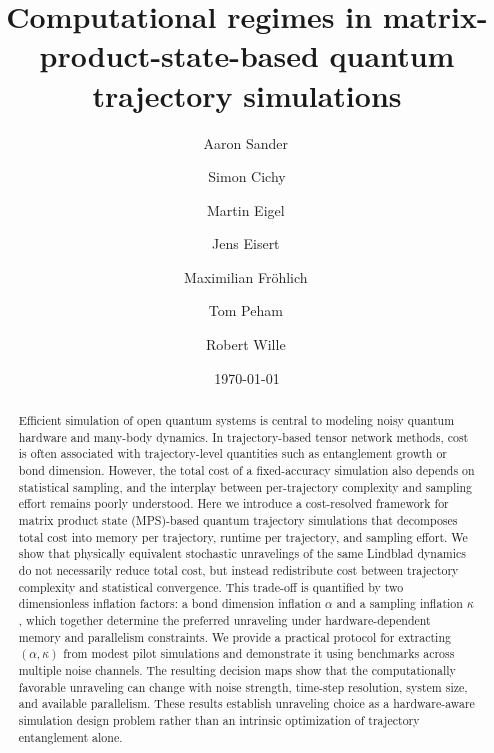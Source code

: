 \documentclass[aps, pra, superscriptaddress, reprint, floatfix]{revtex4-2}
\theoremstyle{plain}
\begin{document}
\title{Computational regimes in matrix-product-state-based quantum trajectory simulations}

\author{Aaron Sander\,}

\author{Simon Cichy}

\author{Martin Eigel\,}

\author{Jens Eisert\,}

\author{Maximilian Fröhlich\,}

\author{Tom Peham\,}

\author{Robert Wille\,}

\date{\today}

\begin{abstract}
Efficient simulation of open quantum systems is central to modeling noisy quantum hardware and many-body dynamics. In trajectory-based tensor network methods, cost is often associated with trajectory-level quantities such as entanglement growth or bond dimension. However, the total cost of a fixed-accuracy simulation also depends on statistical sampling, and the interplay between per-trajectory complexity and sampling effort remains poorly understood. Here we introduce a cost-resolved framework for matrix product state (MPS)-based quantum trajectory simulations that decomposes total cost into memory per trajectory, runtime per trajectory, and sampling effort. We show that physically equivalent stochastic unravelings of the same Lindblad dynamics do not necessarily reduce total cost, but instead redistribute cost between trajectory complexity and statistical convergence. This trade-off is quantified by two dimensionless inflation factors: a bond dimension inflation $\alpha$ and a sampling inflation $\kappa$, which together determine the preferred unraveling under hardware-dependent memory and parallelism constraints. We provide a practical protocol for extracting $(\alpha,\kappa)$ from modest pilot simulations and demonstrate it using benchmarks across multiple noise channels. The resulting decision maps show that the computationally favorable unraveling can change with noise strength, time-step resolution, system size, and available parallelism. These results establish unraveling choice as a hardware-aware simulation design problem rather than an intrinsic optimization of trajectory entanglement alone.
\end{abstract}
\end{document}
